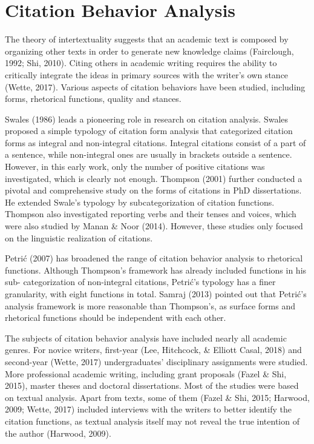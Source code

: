 
\section{Citation Behavior Analysis}
The theory of intertextuality suggests that an academic text is composed by organizing other texts in order to generate new knowledge claims (Fairclough, 1992; Shi, 2010). Citing others in academic writing requires the ability to critically integrate the ideas in primary sources with the writer’s own stance (Wette, 2017). Various aspects of citation behaviors have been studied, including forms, rhetorical functions, quality and stances.

Swales (1986) leads a pioneering role in research on citation analysis. Swales proposed a simple typology of citation form analysis that categorized citation forms as integral and non-integral citations. Integral citations consist of a part of a sentence, while non-integral ones are usually in brackets outside a sentence. However, in this early work, only the number of positive citations was investigated, which is clearly not enough. Thompson (2001) further conducted a pivotal and comprehensive study on the forms of citations in PhD dissertations. He extended Swale’s typology by subcategorization of citation functions. Thompson also investigated reporting verbs and their tenses and voices, which were also studied by Manan \& Noor (2014). However, these studies only focused on the linguistic realization of citations.

Petrić (2007) has broadened the range of citation behavior analysis to rhetorical functions. Although Thompson’s framework has already included functions in his sub- categorization of non-integral citations, Petrić’s typology has a finer granularity, with eight functions in total. Samraj (2013) pointed out that Petrić’s analysis framework is more reasonable than Thompson’s, as surface forms and rhetorical functions should be independent with each other.

The subjects of citation behavior analysis have included nearly all academic genres. For novice writers, first-year (Lee, Hitchcock, \& Elliott Casal, 2018) and second-year (Wette, 2017) undergraduates’ disciplinary assignments were studied. More professional academic writing, including grant proposals (Fazel \& Shi, 2015), master theses and doctoral dissertations. Most of the studies were based on textual analysis. Apart from texts, some of them (Fazel \& Shi, 2015; Harwood, 2009; Wette, 2017) included interviews with the writers to better identify the citation functions, as textual analysis itself may not reveal the true intention of the author (Harwood, 2009).

